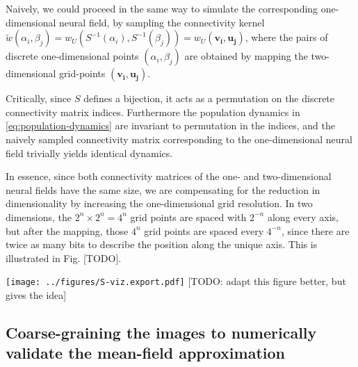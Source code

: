\documentclass[10pt,letterpaper]{article}
\renewcommand{\vec}[1]{\boldsymbol{#1}}
\begin{document}
Naively, we could proceed in the same way to simulate the corresponding one-dimensional neural field, by sampling the connectivity kernel $\tilde w(\alpha_i, \beta_j) = w_U(S^{-1}(\alpha_i), S^{-1}(\beta_j)) = w_U(\vec{v_i}, \vec{u_j})$, where the pairs of discrete one-dimensional points $(\alpha_i,\beta_j)$ are obtained by mapping the two-dimensional grid-points $(\vec{v_i},\vec{u_j})$.

Critically, since $S$ defines a bijection, it acts as a permutation on the discrete connectivity matrix indices. Furthermore the population dynamics in \autoref{eq:population-dynamics} are invariant to permutation in the indices, and the naively sampled connectivity matrix corresponding to the one-dimensional neural field trivially yields identical dynamics.

In essence, since both connectivity matrices of the one- and two-dimensional neural fields have the same size, we are compensating for the reduction in dimensionality by increasing the one-dimensional grid resolution. In two dimensions, the $2^n \times 2^n = 4^n$ grid points are spaced with $2^{-n}$ along every axis, but after the mapping, those $4^n$ grid points are spaced every $4^{-n}$, since there are twice as many bits to describe the position along the unique axis. This is illustrated in Fig. [TODO].

\texttt{[image: ../figures/S-viz.export.pdf]}
[TODO: adapt this figure better, but gives the idea]
\endif



\subsection{Coarse-graining the images to numerically validate the mean-field approximation}
\end{document}
